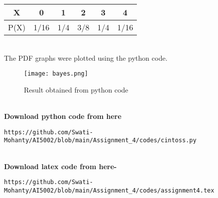 \documentclass[journal,12pt,twocolumn]{IEEEtran}
\begin{document}
\begin{center}
\begin{tabular}{ |c|c|c|c|c|c| } 
 \hline
 X & 0 & 1 & 2 & 3 & 4 \\ \hline
 P(X) & 1/16 & 1/4 & 3/8 & 1/4 & 1/16 \\ 
 \hline
\end{tabular}
\end{center}
\\The PDF graphs were plotted using the python code.
\begin{figure}[h]
\renewcommand{\theenumi}{1}
\centering
\texttt{[image: bayes.png]}
\caption{Result obtained from python code }
\label{Fig:1}
\end{figure}
\\\textbf{Download python code from here}\\
\begin{lstlisting}
https://github.com/Swati-Mohanty/AI5002/blob/main/Assignment_4/codes/cintoss.py
\end{lstlisting}
\\\textbf{Download latex code from here-}\\
\begin{lstlisting}
https://github.com/Swati-Mohanty/AI5002/blob/main/Assignment_4/codes/assignment4.tex
\end{lstlisting}
\end{document}
